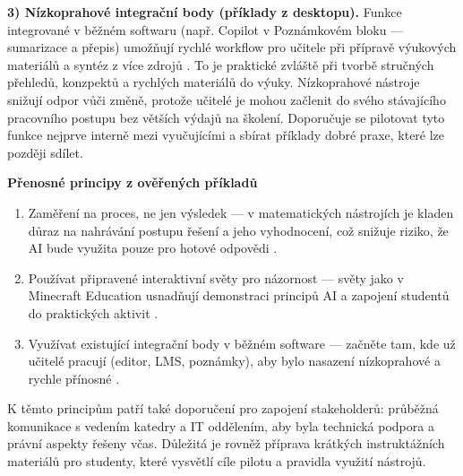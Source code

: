\medskip
\textbf{3) Nízkoprahové integrační body (příklady z desktopu).}  
Funkce integrované v běžném softwaru (např. Copilot v Poznámkovém bloku — sumarizace a přepis) umožňují rychlé workflow pro učitele při přípravě výukových materiálů a syntéz z více zdrojů \cite{kb_ai_101_tipu_pdf_04e4a115_page_14_1}.
To je praktické zvláště při tvorbě stručných přehledů, konzpektů a rychlých materiálů do výuky.
Nízkoprahové nástroje snižují odpor vůči změně, protože učitelé je mohou začlenit do svého stávajícího pracovního postupu bez větších výdajů na školení.
Doporučuje se pilotovat tyto funkce nejprve interně mezi vyučujícími a sbírat příklady dobré praxe, které lze později sdílet.

\bigskip
\noindent \textbf{Přenosné principy z ověřených příkladů}
\begin{enumerate}
  \item Zaměření na proces, ne jen výsledek — v matematických nástrojích je kladen důraz na nahrávání postupu řešení a jeho vyhodnocení, což snižuje riziko, že AI bude využita pouze pro hotové odpovědi \cite{kb_ai_101_tipu_pdf_04e4a115_page_8_1}.
  \item Používat připravené interaktivní světy pro názornost — světy jako v Minecraft Education usnadňují demonstraci principů AI a zapojení studentů do praktických aktivit \cite{kb_ai_101_tipu_pdf_04e4a115_page_15_2}.
  \item Využívat existující integrační body v běžném software — začněte tam, kde už učitelé pracují (editor, LMS, poznámky), aby bylo nasazení nízkoprahové a rychle přínosné \cite{kb_ai_101_tipu_pdf_04e4a115_page_14_1}.
\end{enumerate}
K těmto principům patří také doporučení pro zapojení stakeholderů: průběžná komunikace s vedením katedry a IT oddělením, aby byla technická podpora a právní aspekty řešeny včas.
Důležitá je rovněž příprava krátkých instruktážních materiálů pro studenty, které vysvětlí cíle pilotu a pravidla využití nástrojů.

